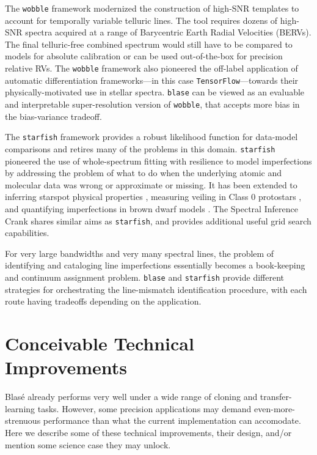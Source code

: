 \documentclass[trackchanges]{aastex631}
\begin{document}
The \texttt{wobble} framework \citep{2019AJ....158..164B} modernized the construction of high-SNR templates to account for temporally variable telluric lines. The tool requires dozens of high-SNR spectra acquired at a range of Barycentric Earth Radial Velocities (BERVs).  The final telluric-free combined spectrum would still have to be compared to models for absolute calibration or can be used out-of-the-box for precision relative RVs.  The \texttt{wobble} framework also pioneered the off-label application of automatic differentiation frameworks---in this case \texttt{TensorFlow}---towards their physically-motivated use in stellar spectra.  \texttt{blase} can be viewed as an evaluable and interpretable super-resolution version of \texttt{wobble}, that accepts more bias in the bias-variance tradeoff.

The \texttt{starfish} framework \citep{czekala15} provides a robust likelihood function for data-model comparisons and retires many of the problems in this domain.  \texttt{starfish} pioneered the use of whole-spectrum fitting with resilience to model imperfections by addressing the problem of what to do when the underlying atomic and molecular data was wrong or approximate or missing.  It has been extended to inferring starspot physical properties \citep{2017ApJ...836..200G}, measuring veiling in Class 0 protostars \citep{2018ApJ...862...85G}, and quantifying imperfections in brown dwarf models \citep{2021ApJ...921...95Z}.  The Spectral Inference Crank \citep[\texttt{sick},][]{2016ApJS..223....8C} shares similar aims as \texttt{starfish}, and provides additional useful grid search capabilities.

For very large bandwidths and very many spectral lines, the problem of identifying and cataloging line imperfections essentially becomes a book-keeping and continuum assignment problem.  \texttt{blase} and \texttt{starfish} provide different strategies for orchestrating the line-mismatch identification procedure, with each route having tradeoffs depending on the application.

\section{Conceivable Technical Improvements}\label{technicalInnovations}

Blas\'e already performs very well under a wide range of cloning and transfer-learning tasks.  However, some precision applications may demand even-more-strenuous performance than what the current implementation can accomodate.  Here we describe some of these technical improvements, their design, and/or mention some science case they may unlock.
\end{document}
